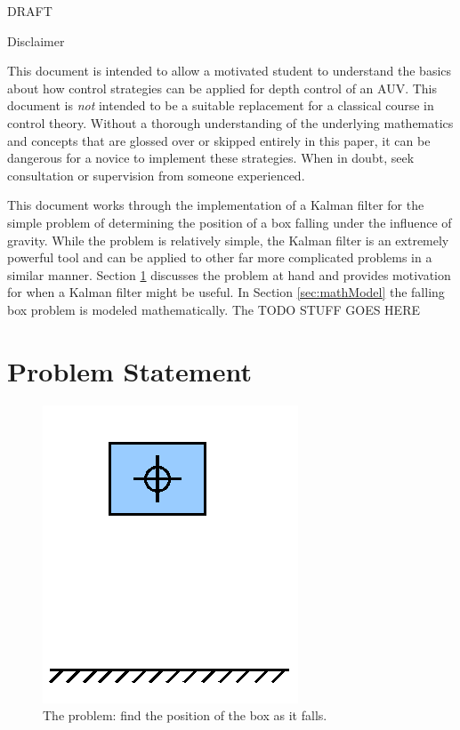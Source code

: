 \documentclass{article}
\begin{document}
\maketitle

\begin{center}
\Huge 
DRAFT
\normalsize
\end{center}
\vspace{4cm}

Disclaimer

This document is intended to allow a motivated student to understand the basics about how control strategies can be applied for depth control of an AUV.  This document is \emph{not} intended to be a suitable replacement for a classical course in control theory.  Without a thorough understanding of the underlying mathematics and concepts that are glossed over or skipped entirely in this paper, it can be dangerous for a novice to implement these strategies.  When in doubt, seek consultation or supervision from someone experienced.

\newpage

This document works through the implementation of a Kalman filter for the simple problem of determining the position of a box falling under the influence of gravity.  While the problem is relatively simple, the Kalman filter is an extremely powerful tool and can be applied to other far more complicated problems in a similar manner.  Section \ref{sec:probStatement} discusses the problem at hand and provides motivation for when a Kalman filter might be useful.  In Section \ref{sec:mathModel} the falling box problem is modeled mathematically.  The TODO STUFF GOES HERE


\section{Problem Statement}
\label{sec:probStatement}

\begin{figure}[h]
\includegraphics[scale=0.25]{boxPicture.png}
\centering
\caption{The problem: find the position of the box as it falls.}
\label{fig:boxPic}
\end{figure}
\end{document}
